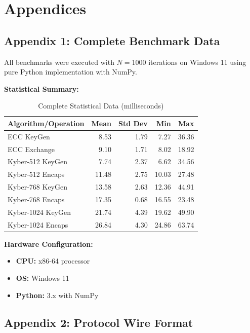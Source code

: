 \chapter*{Appendices}

\section*{Appendix 1: Complete Benchmark Data}

All benchmarks were executed with $N=1000$ iterations on Windows 11 using pure Python implementation with NumPy.

\textbf{Statistical Summary:}

\begin{table}[h]
\centering
\caption{Complete Statistical Data (milliseconds)}
\begin{tabular}{l|r|r|r|r}
\hline
\textbf{Algorithm/Operation} & \textbf{Mean} & \textbf{Std Dev} & \textbf{Min} & \textbf{Max} \\ \hline
ECC KeyGen & 8.53 & 1.79 & 7.27 & 36.36 \\
ECC Exchange & 9.10 & 1.71 & 8.02 & 18.92 \\
Kyber-512 KeyGen & 7.74 & 2.37 & 6.62 & 34.56 \\
Kyber-512 Encaps & 11.48 & 2.75 & 10.03 & 27.48 \\
Kyber-768 KeyGen & 13.58 & 2.63 & 12.36 & 44.91 \\
Kyber-768 Encaps & 17.35 & 0.68 & 16.55 & 23.48 \\
Kyber-1024 KeyGen & 21.74 & 4.39 & 19.62 & 49.90 \\
Kyber-1024 Encaps & 26.84 & 4.30 & 24.86 & 63.74 \\ \hline
\end{tabular}
\end{table}

\textbf{Hardware Configuration:}

\begin{itemize}
\item \textbf{CPU:} x86-64 processor
\item \textbf{OS:} Windows 11
\item \textbf{Python:} 3.x with NumPy
\end{itemize}

\section*{Appendix 2: Protocol Wire Format}

